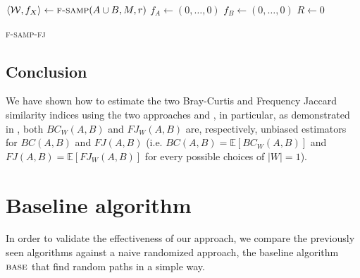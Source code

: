 \begin{algorithm}[h]
	\small
	\DontPrintSemicolon
	$\langle \mathcal{W}, f_X \rangle \gets \textsc{f-samp}(A \cup B, M, r)$ \;
	$f_A \gets (0,\ldots,0)$\;
	$f_B \gets (0,\ldots,0)$\;
	$R \gets 0$\;
	\caption{\textsc{f-samp-fj}}
	\label{alg:randomsample}
	\label{alg:sample}
\end{algorithm}

\subsection*{Conclusion}

We have shown how to estimate the two Bray-Curtis and Frequency Jaccard similarity indices using the two approaches \fcount and \fsamp,
in particular, as demonstrated in \cite{SubSim}, both $BC_{W}(A,B)$ and $FJ_{W}(A,B)$ are, respectively,  unbiased estimators for $BC(A,B)$ and $FJ(A,B)$ 
(i.e. $BC(A,B) = \mathbb{E}[BC_{W}(A,B)]$ and $FJ(A,B) = \mathbb{E}[FJ_{W}(A,B)]$ for every possible choices of $|W| = 1$).

\clearpage
\section{Baseline algorithm}

In order to validate the effectiveness of our approach, we compare the previously seen algorithms against a naive randomized approach,
the baseline algorithm $\textsc{base}$ that find random paths in a simple way.

